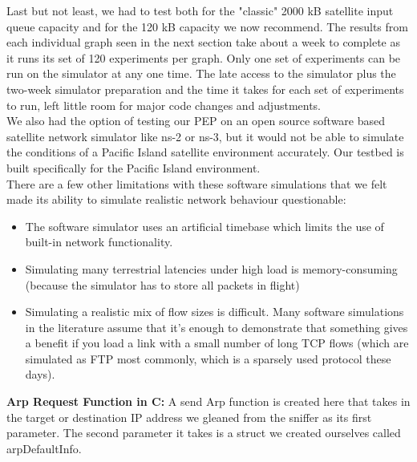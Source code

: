 \documentclass{uathesis}
\begin{document}
\begin{appendices}
Last but not least, we had to test both for the "classic" 2000 kB satellite input queue capacity and for the 120 kB capacity we now recommend. 
The results from each individual graph seen in the next section take about a week to complete as it runs its set of 120 experiments per graph. Only one set of experiments can be run on the simulator at any one time. The late access to the simulator plus the two-week simulator preparation and the time it takes for each set of experiments to run, left little room for major code changes and adjustments. \\

We also had the option of testing our PEP on an open source software based satellite network simulator like ns-2 or ns-3, but it would not be able to simulate the conditions of a Pacific Island satellite environment accurately. Our testbed is built specifically for the Pacific Island environment.\\

There are a few other limitations with these software simulations that we felt made its ability to simulate realistic network behaviour questionable:\\

\begin{itemize}
\item The software simulator uses an artificial timebase which limits the use of built-in network functionality.
\item Simulating many terrestrial latencies under high load is memory-consuming (because the simulator has to store all packets in flight)
\item Simulating a realistic mix of flow sizes is difficult. Many software simulations in the literature assume that it's enough to demonstrate that something gives a benefit if you load a link with a small number of long TCP flows (which are simulated as FTP most commonly, which is a sparsely used protocol these days).\\
\end{itemize}

\noindent \textbf{Arp Request Function in C:}
A send Arp function is created here that takes in the target or destination IP address we gleaned from the sniffer as its first parameter. The second parameter it takes is a struct we created ourselves called arpDefaultInfo. \\


\end{appendices}
\end{document}
